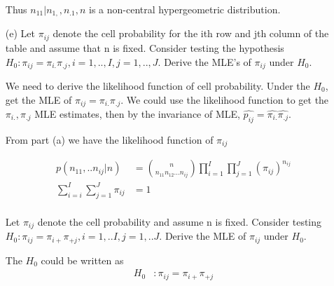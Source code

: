 \begin{itemize}
Thus $n_{11} | n_{1,}, n_{.1}, n$ is a non-central hypergeometric distribution.

\item[(e)] Let $\pi_{ij}$ denote the cell probability for the ith row and jth column of the table and assume that n is fixed. Consider testing the hypothesis $H_0: \pi_{ij} = \pi_{i.} \pi_{.j}, i=1,..,I, j= 1,..,J$. Derive the MLE's 
of $\pi_{ij}$ under $H_0$.

We need to derive the likelihood function of cell probability. Under the $H_0$, get the MLE of $\pi_{ij} = \pi_{i.} \pi_{.j}$. We could use the likelihood function to get the $\pi_{i.}, \pi_{.j}$ MLE estimates, then by the invariance of MLE, $\hat{p_{ij}} = \hat{\pi_{i.}} \hat{\pi_{.j}}$.

From part (a) we have the likelihood function of $\pi_{ij}$

\begin{align*}
	p(n_{11},..n_{ij}| n) &	= {n \choose n_{11} n_{12} ... n_{ij}} \prod_{i=1}^I \prod_{j=1}^J \left( \pi_{ij} \right)^{n_{ij}} \\
	\sum_{i=i}^I \sum_{j=1}^J \pi_{ij} &= 1\\
\end{align*}

Let $\pi_{ij}$ denote the cell probability and assume n is fixed. Consider testing $H_0: \pi_{ij} = \pi_{i+} \pi_{+j}, i=1,..I, j=1,..J$. Derive the MLE of $\pi_{ij}$ under $H_0$.

The $H_0$ could be written as 
\begin{align*}
	H_0 &: \pi_{ij} = \pi_{i+} \pi_{+j}
\end{align*}


\end{itemize}
